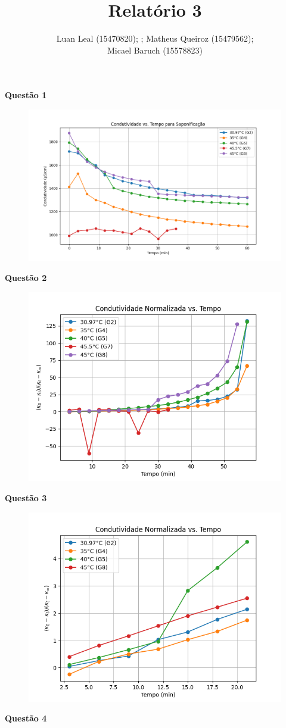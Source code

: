 \documentclass{article}
\author{Luan Leal (15470820);
; Matheus Queiroz (15479562);\\ Micael Baruch (15578823)}
\title{Relatório 3}
\begin{document}
\maketitle

\textbf{Questão 1}
\begin{figure}[H]
    \centering
    \includegraphics[width=.5\linewidth]{figs/graph1.png}
\end{figure}
\textbf{Questão 2}
\begin{figure}[H]
    \centering
    \includegraphics[width=.5\linewidth]{figs/graph2.png}
\end{figure}
\textbf{Questão 3}
\begin{figure}[H]
    \centering
    \includegraphics[width=.5\linewidth]{figs/graph3.png}
\end{figure}
\textbf{Questão 4}
\end{document}
